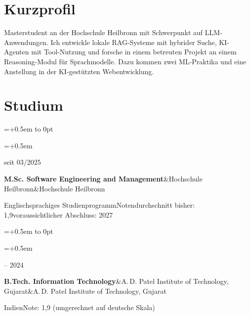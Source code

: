 \documentclass[10pt,a4paper]{article}
\newlength{\leftcol}\setlength{\leftcol}{2.45cm}
\newcommand{\gap}{0.5em}
\newcommand{\sep}{\hspace{0.45em}\textbar\hspace{0.45em}}
\newcommand{\entry}[3]{%
  \begingroup\raggedright\leftskip=\dimexpr\leftcol+\gap\relax\noindent
  \hspace*{-\dimexpr\leftcol+\gap\relax}%
  \vtop to 0pt{\hsize=\dimexpr\leftcol+\gap\relax\raggedright\small\color{mid}\noindent #1\par\vss}%
  #2\par #3\par\endgroup\vspace{4pt}}
\newcommand{\etitle}[2]{\textbf{#1}\ifx&#2&\else\textcolor{mid}{\sep}#2\fi}
\begin{document}
\section*{Kurzprofil}
Masterstudent an der Hochschule Heilbronn mit Schwerpunkt auf LLM-Anwendungen. Ich entwickle lokale RAG-Systeme mit hybrider Suche, KI-Agenten mit Tool-Nutzung und forsche in einem betreuten Projekt an einem Reasoning-Modul für Sprachmodelle. Dazu kommen zwei ML-Praktika und eine Anstellung in der KI-gestützten Webentwicklung.

\section*{Studium}
\entry{seit 03/2025}
  {\etitle{M.Sc. Software Engineering and Management}{Hochschule Heilbronn}}
  {\small Englischsprachiges Studienprogramm\sep Notendurchschnitt bisher: 1,9\sep voraussichtlicher Abschluss: 2027}
\entry{2020 -- 2024}
  {\etitle{B.Tech. Information Technology}{A.\,D. Patel Institute of Technology, Gujarat}}
  {\small Indien\sep Note: 1,9 (umgerechnet auf deutsche Skala)}

\end{document}
